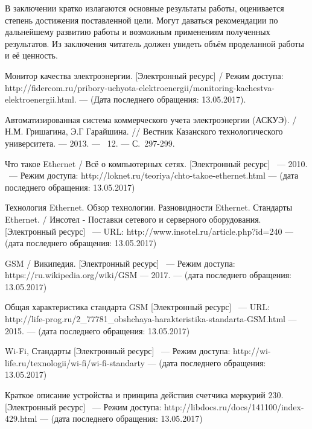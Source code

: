 \documentclass[utf8,14pt, coursreport]{G7-32}
\begin{document}
\fi

\backmatter %

\Conclusion

В заключении кратко излагаются основные результаты работы, оценивается степень достижения поставленной цели. Могут даваться рекомендации по дальнейшему развитию работы и возможным применениям полученных результатов. Из заключения читатель должен увидеть объём проделанной работы и её ценность.

\begin{thebibliography}{99}

 Монитор качества электроэнергии. [Электронный ресурс] /  Режим доступа: http://fidercom.ru/pribory-uchyota-elektroenergii/monitoring-kachestva-\\elektroenergii.html. --- (Дата последнего обращения: 13.05.2017).

 Автоматизированная система коммерческого учета электроэнергии (АСКУЭ). / Н.М. Гришагина, Э.Г Гарайшина. // Вестник Казанского технологического университета. --- 2013. --- \No~12. --- С.~297-299.

 Что такое Ethernet / Всё о компьютерных сетях. [Электронный ресурс] ~--- 2010. ~--- Режим доступа: http://loknet.ru/teoriya/chto-takoe-ethernet.html --- (дата последнего обращения: 13.05.2017)

 Технология Ethernet. Обзор технологии. Разновидности Ethernet. Стандарты Ethernet. / Инсотел - Поставки сетевого и серверного оборудования. [Электронный ресурс] ~--- URL: http://www.insotel.ru/article.php?id=240 --- (дата последнего обращения: 13.05.2017)

 GSM / Википедия. [Электронный ресурс] ~--- Режим доступа: https://ru.wikipedia.org/wiki/GSM --- 2017. --- (дата последнего обращения: 13.05.2017)

 Общая характеристика стандарта GSM [Электронный ресурс] ~--- URL: http://life-prog.ru/2\_77781\_obshchaya-harakteristika-standarta-GSM.html  --- 2015. --- (дата последнего обращения: 13.05.2017)

 Wi-Fi, Стандарты [Электронный ресурс] ~--- Режим доступа: http://wi-life.ru/texnologii/wi-fi/wi-fi-standarty --- (дата последнего обращения: 13.05.2017)

 Краткое описание устройства и принципа действия счетчика меркурий 230. [Электронный ресурс] ~--- Режим доступа: http://libdocs.ru/docs/141100/index-429.html --- (дата последнего обращения: 13.05.2017)


\end{thebibliography}
\end{document}
